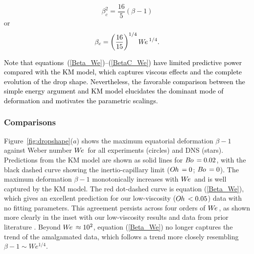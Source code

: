 \documentclass{jfm}
\newcommand{\edit}[1]{\textcolor{black}{#1}}
\newcommand{\We}{W\kern-0.15em e\,}
\newcommand{\Bo}{B\kern-0.05em o\,}
\newcommand{\Oh}{O\kern-0.05em h\,}
\begin{document}
\begin{equation}
\beta_c^2=\frac{16}{5}(\beta-1) \label{BetaC_Beta}
\end{equation}
or 
\begin{equation}
\beta_c=\left(\frac{16}{15}\right)^{1/4} \We^{1 / 4}. \label{BetaC_We}
\end{equation}

\edit{Note that equations~(\ref{Beta_We})–(\ref{BetaC_We}) have limited predictive power compared with the KM model, which captures viscous effects and the complete evolution of the drop shape. Nevertheless, the favorable comparison between the simple energy argument and KM model elucidates the dominant mode of deformation and motivates the parametric scalings.}

\subsubsection{Comparisons} \label{subsubsec:comparisions}

Figure~\ref{fig:dropshape}($a$) shows the maximum equatorial deformation $\beta - 1$ against Weber number $\We$ for all experiments (circles) and DNS (stars). Predictions from the KM model are shown as solid lines for $\Bo=0.02$, with the black dashed curve showing the inertio-capillary limit ($\Oh=0$; $\Bo=0$). The maximum deformation $\beta - 1$ monotonically increases with $\We$ and is well captured by the KM model. The red dot-dashed curve is equation (\ref{Beta_We}), which gives an excellent prediction for our low-viscosity ($\Oh<0.05$) data with no fitting parameters. This agreement persists across four orders of $\We$, as shown more clearly in the inset with our low-viscosity results and data from prior literature \citep{okumura2003water,clanet2004maximal,biance2006elasticity,laan2014maximum}. Beyond $\We \approx 10^{2}$, equation (\ref{Beta_We}) no longer captures the trend of the amalgamated data, which follows a trend more closely resembling $\beta - 1 \sim We^{1/4}$. 
\end{document}
